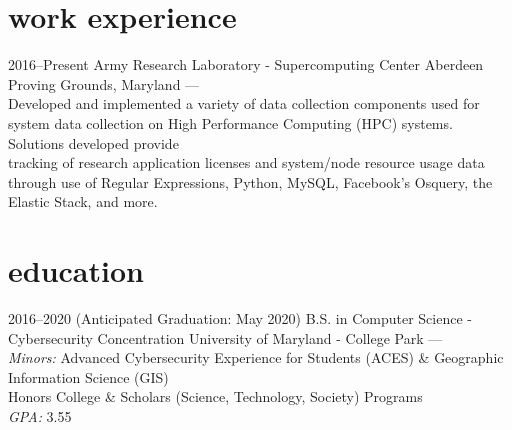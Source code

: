 \documentclass[print]{friggeri-cv} %
\begin{document}

\section{work experience}

\begin{entrylist}


\entry
{2016--Present}
{Army Research Laboratory - Supercomputing Center}
{Aberdeen Proving Grounds, Maryland}
{---\\Developed and implemented a variety of data collection components used for system data collection on High Performance Computing (HPC) systems. Solutions developed provide \\ tracking of research application licenses and system/node resource usage data through use of Regular Expressions, Python, MySQL, Facebook’s Osquery, the Elastic Stack, and more.}


\end{entrylist}


\section{education}

\begin{entrylist}


\entry
{2016--2020 (Anticipated Graduation: May 2020)}
{B.S. in Computer Science - Cybersecurity Concentration} %
{University of Maryland - College Park}
{---\\ \emph{Minors:} Advanced Cybersecurity Experience for Students (ACES) \& Geographic Information Science (GIS) \\ Honors College \& Scholars (Science, Technology, Society) Programs \\ \emph{GPA: } 3.55}



\end{entrylist}
\end{document}
